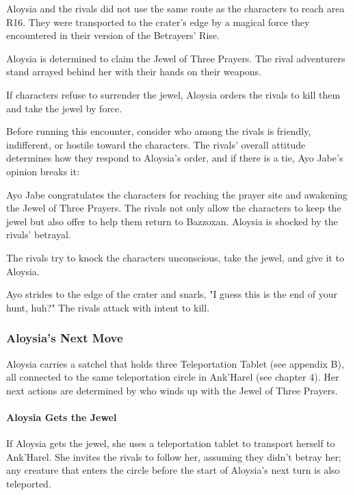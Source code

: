 \documentclass[10pt,a4paper,twoside,bg=print,twocolumn,openany,nodeprecatedcode]{dndbook}
\begin{document}
Aloysia and the rivals did not use the same route as the characters to reach area R16. They were transported to the crater's edge by a magical force they encountered in their version of the Betrayers' Rise.

Aloysia is determined to claim the Jewel of Three Prayers. The rival adventurers stand arrayed behind her with their hands on their weapons.

If characters refuse to surrender the jewel, Aloysia orders the rivals to kill them and take the jewel by force.

Before running this encounter, consider who among the rivals is friendly, indifferent, or hostile toward the characters. The rivals' overall attitude determines how they respond to Aloysia's order, and if there is a tie, Ayo Jabe's opinion breaks it:


\begin{description}[nolistsep]
\item[Friendly Rivals.]
Ayo Jabe congratulates the characters for reaching the prayer site and awakening the Jewel of Three Prayers. The rivals not only allow the characters to keep the jewel but also offer to help them return to Bazzoxan. Aloysia is shocked by the rivals' betrayal.
\item[Indifferent Rivals.]
The rivals try to knock the characters unconscious, take the jewel, and give it to Aloysia.
\item[Hostile Rivals.]
Ayo strides to the edge of the crater and snarls, "I guess this is the end of your hunt, huh?" The rivals attack with intent to kill.
\end{description}

\subsubsection{Aloysia's Next Move}
Aloysia carries a satchel that holds three Teleportation Tablet (see appendix B), all connected to the same teleportation circle in Ank'Harel (see chapter 4). Her next actions are determined by who winds up with the Jewel of Three Prayers.

\paragraph{Aloysia Gets the Jewel}
If Aloysia gets the jewel, she uses a teleportation tablet to transport herself to Ank'Harel. She invites the rivals to follow her, assuming they didn't betray her; any creature that enters the circle before the start of Aloysia's next turn is also teleported.
\end{document}

